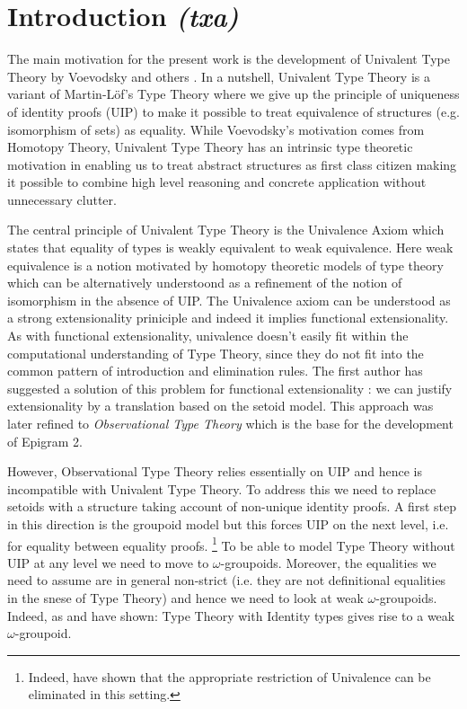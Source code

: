 \section{Introduction \textit{(txa)}}

The main motivation for the present work is the development of
Univalent Type Theory by Voevodsky and others \cite{voevodsky}. In a
nutshell, Univalent Type Theory is a variant of Martin-L\"of's Type
Theory where we give up the principle of uniqueness of identity proofs
(UIP) to make it possible to treat equivalence of structures
(e.g. isomorphism of sets) as equality. While Voevodsky's motivation
comes from Homotopy Theory, Univalent Type Theory has an intrinsic
type theoretic motivation in enabling us to treat abstract structures
as first class citizen making it possible to combine high level
reasoning and concrete application without unnecessary clutter. 

The central principle of Univalent Type Theory is the Univalence Axiom
which states that equality of types is weakly equivalent to weak
equivalence. Here weak equivalence is a notion motivated by homotopy
theoretic models of type theory which can be alternatively understoond
as a refinement of the notion of isomorphism in the absence of
UIP. The Univalence axiom can be understood as a strong extensionality
priniciple and indeed it implies functional extensionality. As with
functional extensionality, univalence doesn't easily fit within the
computational understanding of Type Theory, since they do not fit into
the common pattern of introduction and elimination rules. The first
author has suggested a solution of this problem for functional
extensionality \cite{alti:lics99}: we can justify extensionality by a
translation based on the setoid model. This approach was later refined
\cite{plpv08} to \emph{Observational Type Theory} which is the base
for the development of Epigram 2.

However, Observational Type Theory relies essentially on UIP and hence
is incompatible with Univalent Type Theory. To address this we need to
replace setoids with a structure taking account of non-unique identity
proofs. A first step in this direction is the groupoid model
\cite{HS:groupoid} but this forces UIP on the next level, i.e. for
equality between equality proofs. 
\footnote{Indeed, \cite{HarperLicata} have shown that the appropriate
  restriction of Univalence can be eliminated in this setting.}
To be able to model Type Theory
without UIP at any level we need to move to
$\omega$-groupoids. Moreover, the equalities we need to assume are in
general non-strict (i.e. they are not definitional equalities in the
snese of Type Theory) and hence we need to look at weak
$\omega$-groupoids. Indeed, as \cite{garner} and \cite{lumsdaine} have
shown: Type Theory with Identity types gives rise to a weak
$\omega$-groupoid. 

